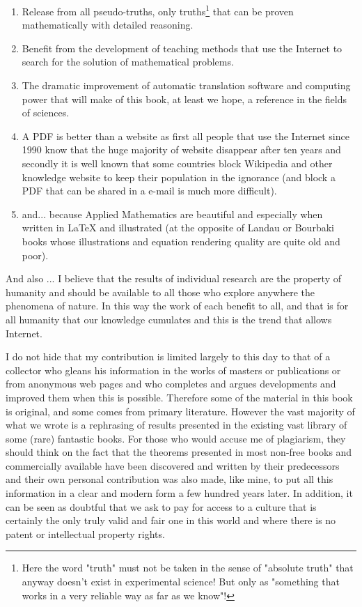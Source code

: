 \begin{enumerate}
		\item Release from all pseudo-truths, only truths\footnote{Here the word "truth" must not be taken in the sense of "absolute truth" that anyway doesn't exist in experimental science! But only as "something that works in a very reliable way as far as we know"!} that can be proven mathematically with detailed reasoning.

		\item Benefit from the development of teaching methods that use the Internet to search for the solution of mathematical problems.

		\item The dramatic improvement of automatic translation software and computing power that will make of this book, at least we hope, a reference in the fields of sciences.
		
		\item A PDF is better than a website as first all people that use the Internet since 1990 know that the huge majority of website disappear after ten years and secondly it is well known that some countries block Wikipedia and other knowledge website to keep their population in the ignorance (and block a PDF that can be shared in a e-mail is much more difficult).
		
		\item and... because Applied Mathematics are beautiful and especially when written in \LaTeX{} and illustrated (at the opposite of Landau or Bourbaki books whose illustrations and equation rendering quality are quite old and poor).
\end{enumerate}

	And also ... I believe that the results of individual research are the property of humanity and should be available to all those who explore anywhere the phenomena of nature. In this way the work of each benefit to all, and that is for all humanity that our knowledge cumulates and this is the trend that allows Internet.

	I do not hide that my contribution is limited largely to this day to that of a collector who gleans his information in the works of masters or publications or from anonymous web pages and who completes and argues developments and improved them when this is possible. Therefore some of the material in this book is original, and some comes from primary literature. However the vast majority of what we wrote is a rephrasing of results presented in the existing vast library of some (rare) fantastic books. For those who would accuse me of plagiarism, they should think on the fact that the theorems presented in most non-free books and commercially available have been discovered and written by their predecessors and their own personal contribution was also made, like mine, to put all this information in a clear and modern form a few hundred years later. In addition, it can be seen as doubtful that we ask to pay for access to a culture that is certainly the only truly valid and fair one in this world and where there is no patent or intellectual property rights.
	

